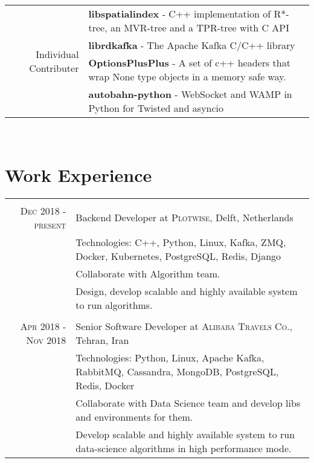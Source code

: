 \documentclass[a4paper,11pt]{article}
\begin{document}
\begin{tabular}{r|p{11cm}}

    \multirow{4}{*}{Individual Contributer}
    & \textbf{libspatialindex} - C++ implementation of R*-tree, an MVR-tree and a TPR-tree with C API\\
    & \textbf{librdkafka} - The Apache Kafka C/C++ library\\
    & \textbf{OptionsPlusPlus} - A set of c++ headers that wrap None type objects in a memory safe way.\\
    & \textbf{autobahn-python} - WebSocket and WAMP in Python for Twisted and asyncio\\

\end{tabular}\\

\section{Work Experience}
\begin{tabular}{r|p{11cm}}

    \multicolumn{2}{c}{}\\
    \textsc{Dec 2018 - present}
    & Backend Developer at \textsc{Plotwise},
    Delft, Netherlands\\
    &\footnotesize{Technologies: C++, Python, Linux, Kafka, ZMQ, Docker, Kubernetes, PostgreSQL, Redis, Django}\\
    &\footnotesize{Collaborate with Algorithm team.}\\
    &\footnotesize{Design, develop scalable and highly available system to run algorithms.}\\

    \multicolumn{2}{c}{}\\
    \textsc{Apr 2018 - Nov 2018}
    & Senior Software Developer at \textsc{Alibaba Travels Co.},
    Tehran, Iran\\
    &\footnotesize{Technologies: Python, Linux, Apache Kafka, RabbitMQ, Cassandra, MongoDB, PostgreSQL, Redis, Docker}\\
    &\footnotesize{Collaborate with Data Science team and develop libs and environments for them.}\\
    &\footnotesize{Develop scalable and highly available system to run data-science algorithms in high performance mode.}\\

\end{tabular}
\end{document}
